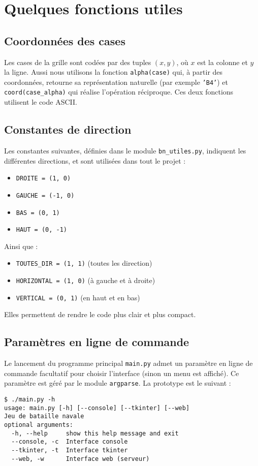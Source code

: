 \chapter{Quelques fonctions utiles}

\section{Coordonnées des cases}
Les cases de la grille sont codées par des tuples $(x,y)$, où $x$ est la colonne et $y$ la ligne. Aussi nous utilisons la fonction \texttt{alpha(case)} qui, à partir des coordonnées, retourne sa représentation naturelle (par exemple \texttt{'B4'}) et \texttt{coord(case\_alpha)} qui réalise l'opération réciproque. Ces deux fonctions utilisent le code ASCII.

\section{Constantes de direction}
Les constantes suivantes, définies dans le module \texttt{bn\_utiles.py}, indiquent les différentes directions, et sont utilisées dans tout le projet :
\begin{itemize}
\item \texttt{DROITE = (1, 0)} 
\item \texttt{GAUCHE = (-1, 0)}
\item \texttt{BAS = (0, 1)}
\item \texttt{HAUT = (0, -1)}
\end{itemize}
Ainsi que :
\begin{itemize}
\item \texttt{TOUTES\_DIR = (1, 1)} (toutes les direction)
\item \texttt{HORIZONTAL = (1, 0)} (à gauche et à droite)
\item \texttt{VERTICAL = (0, 1)} (en haut et en bas)
\end{itemize}
Elles permettent de rendre le code plus clair et plus compact.

\section{Paramètres en ligne de commande}
Le lancement du programme principal \texttt{main.py} admet un paramètre en ligne de commande facultatif pour choisir l'interface (sinon un menu est affiché). Ce paramètre est géré par le module \texttt{argparse}. La prototype est le suivant :

%
%

\begin{verbatim}
$ ./main.py -h
usage: main.py [-h] [--console] [--tkinter] [--web]
Jeu de bataille navale
optional arguments:
  -h, --help     show this help message and exit
  --console, -c  Interface console
  --tkinter, -t  Interface tkinter
  --web, -w      Interface web (serveur)
\end{verbatim}